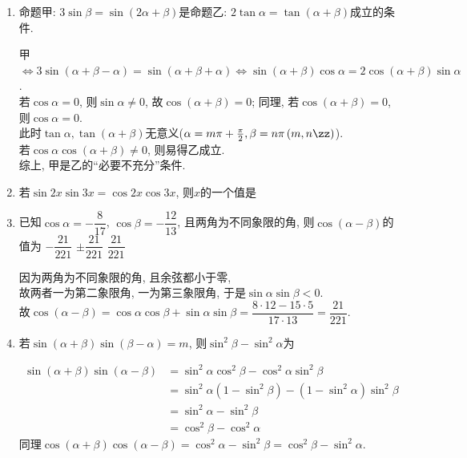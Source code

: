 \begin{enumerate}
\item 命题甲: $3\sin\beta=\sin\left(2\alpha+\beta\right)$是命题乙: $2\tan\alpha=\tan\left(\alpha+\beta\right)$成立的条件. 
\begin{jieda}
甲$\iff3\sin\left(\alpha+\beta-\alpha\right)=\sin\left(\alpha+\beta+\alpha\right)\iff \sin\left(\alpha+\beta\right)\cos\alpha=2\cos\left(\alpha+\beta\right)\sin\alpha$. \\
若$\cos\alpha=0$, 则$\sin\alpha\neq 0$, 故$\cos\left(\alpha+\beta\right)=0$; 同理, 若$\cos\left(\alpha+\beta\right)=0$, 则$\cos\alpha=0$. \\
此时$\tan\alpha,\tan\left(\alpha+\beta\right)$无意义($\alpha=m\pi+\frac{\pi}{2},\beta=n\pi\left(m,n\zz\right)$). \\
若$\cos\alpha\cos\left(\alpha+\beta\right)\neq 0$, 则易得乙成立. \\
综上, 甲是乙的``必要不充分''条件. 
\end{jieda}

\item 若$\sin2x\sin3x=\cos2x\cos3x$, 则$x$的一个值是

\item 已知$\cos\alpha=-\dfrac{8}{17}$, $\cos\beta=-\dfrac{12}{13}$, 且两角为不同象限的角, 则$\cos\left(\alpha-\beta\right)$的值为
{$-\dfrac{21}{221}$}
{$\pm\dfrac{21}{221}$}
{$\dfrac{21}{221}$}
\begin{jieda}
因为两角为不同象限的角, 且余弦都小于零, \\
故两者一为第二象限角, 一为第三象限角, 于是$\sin\alpha\sin\beta<0$. \\
故$\cos\left(\alpha-\beta\right)=\cos\alpha\cos\beta+\sin\alpha\sin\beta=\dfrac{8\cdot12-15\cdot5}{17\cdot13}=\dfrac{21}{221}$. 
\end{jieda}

\item 若$\sin\left(\alpha+\beta\right)\sin\left(\beta-\alpha\right)=m$, 则$\sin^2\beta-\sin^2\alpha$为
\begin{jieda}
\begin{align*}
\sin\left(\alpha+\beta\right)\sin\left(\alpha-\beta\right) 
& =\sin^2\alpha\cos^2\beta-\cos^2\alpha\sin^2\beta\\
& =\sin^2\alpha\left(1-\sin^2\beta\right)-\left(1-\sin^2\alpha\right)\sin^2\beta\\
& =\sin^2\alpha-\sin^2\beta\\
& =\cos^2\beta-\cos^2\alpha
\end{align*}
同理$\cos\left(\alpha+\beta\right)\cos\left(\alpha-\beta\right)=\cos^2\alpha-\sin^2\beta=\cos^2\beta-\sin^2\alpha$. 
\end{jieda}



\end{enumerate}

